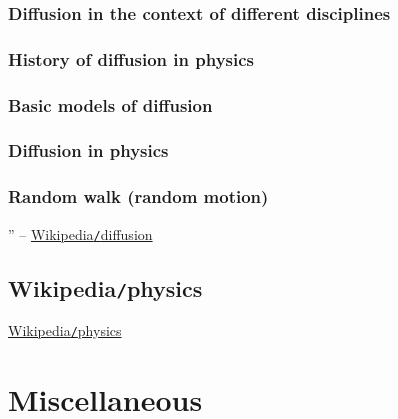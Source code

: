 \documentclass{article}
\begin{document}
\subsubsection{Diffusion in the context of different disciplines}


\subsubsection{History of diffusion in physics}

\subsubsection{Basic models of diffusion}

\subsubsection{Diffusion in physics}

\subsubsection{Random walk (random motion)}


'' -- \href{https://en.wikipedia.org/wiki/Diffusion}{Wikipedia{\tt/}diffusion}


\subsection{Wikipedia{\tt/}physics}
\href{https://en.wikipedia.org/wiki/Physics}{Wikipedia{\tt/}physics}



\section{Miscellaneous}


\printbibliography[heading=bibintoc]
	
\end{document}
